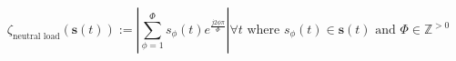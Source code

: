 \begin{equation}
	\zeta_\text{neutral load}(\textbf{s}(t)) := \left|\sum_{\phi=1}^{\Phi} s_\phi(t)e^{\frac{j2\phi\pi}{\Phi}}\right| \forall t \text{ where } s_\phi(t) \in \textbf{s}(t) \text{ and } \Phi \in \mathbb{Z}^{>0}
\label{ch1:equ:neutral-load}
\end{equation}